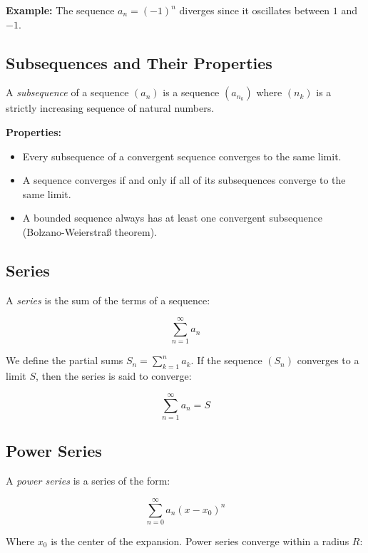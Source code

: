 \textbf{Example:}
\vspace{\baselineskip}
The sequence \(a_n = {(-1)}^n\) diverges since it oscillates between \(1\) and \(-1\).

\subsection{Subsequences and Their Properties}

A \emph{subsequence} of a sequence \((a_n)\) is a sequence \((a_{n_k})\) where \((n_k)\) is a strictly 
increasing sequence of natural numbers.

\textbf{Properties:}

\begin{itemize}

    \item Every subsequence of a convergent sequence converges to the same limit.

    \item A sequence converges if and only if all of its subsequences converge to the same limit.

    \item A bounded sequence always has at least one convergent subsequence (Bolzano-Weierstraß theorem).

\end{itemize}

\subsection{Series}

A \emph{series} is the sum of the terms of a sequence:

\[
    \sum_{n=1}^{\infty} a_n
\]

We define the partial sums \(S_n = \sum_{k=1}^n a_k\). If the sequence \((S_n)\) converges to a limit \(S\), then the series is said to converge:

\[
    \sum_{n=1}^{\infty} a_n = S
\]

\subsection{Power Series}

A \emph{power series} is a series of the form:

\[
    \sum_{n=0}^{\infty} a_n {(x - x_0)}^n
\]

Where \(x_0\) is the center of the expansion. Power series converge within a radius \(R\):

